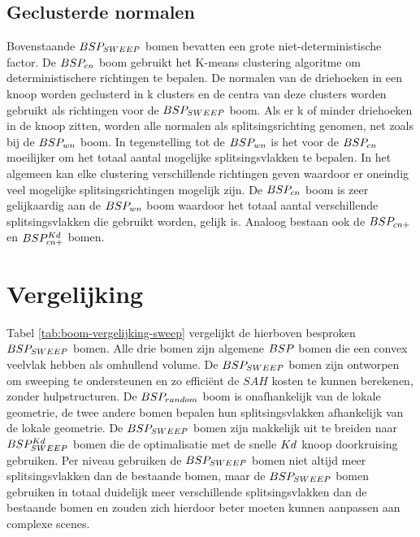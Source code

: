     

    
\subsection{Geclusterde normalen}
    Bovenstaande $BSP_{SWEEP}$ bomen bevatten een grote niet-deterministische factor.
    De $BSP_{cn}$ boom gebruikt het K-means clustering algoritme om deterministischere richtingen te bepalen.
    De normalen van de driehoeken in een knoop worden geclusterd in k clusters en de centra van deze clusters worden gebruikt als richtingen voor de $BSP_{SWEEP}$ boom.
    Als er k of minder driehoeken in de knoop zitten, worden alle normalen als splitsingsrichting genomen, net zoals bij de $BSP_{wn}$ boom.
    In tegenstelling tot de $BSP_{wn}$ is het voor de $BSP_{cn}$ moeilijker om het totaal aantal mogelijke splitsingsvlakken te bepalen.
    In het algemeen kan elke clustering verschillende richtingen geven waardoor er oneindig veel mogelijke splitsingsrichtingen mogelijk zijn.
    De $BSP_{cn}$ boom is zeer gelijkaardig aan de $BSP_{wn}$ boom waardoor het totaal aantal verschillende splitsingsvlakken die gebruikt worden, gelijk is. Analoog bestaan ook de $BSP_{cn+}$ en $BSP^{Kd}_{cn+}$ bomen.





\section{Vergelijking}
Tabel \ref{tab:boom-vergelijking-sweep} vergelijkt de hierboven besproken $BSP_{SWEEP}$ bomen.
Alle drie bomen zijn algemene $BSP$ bomen die een convex veelvlak hebben als omhullend volume.
De $BSP_{SWEEP}$ bomen zijn ontworpen om sweeping te ondersteunen en zo efficiënt de $SAH$ kosten te kunnen berekenen, zonder hulpstructuren.
De $BSP_{random}$ boom is onafhankelijk van de lokale geometrie, de twee andere bomen bepalen hun splitsingsvlakken afhankelijk van de lokale geometrie.
De $BSP_{SWEEP}$ bomen zijn makkelijk uit te breiden naar $BSP^{Kd}_{SWEEP}$ bomen die de optimalisatie met de snelle $Kd$ knoop doorkruising gebruiken.
Per niveau gebruiken de $BSP_{SWEEP}$ bomen niet altijd meer splitsingsvlakken dan de bestaande bomen, maar de $BSP_{SWEEP}$ bomen gebruiken in totaal duidelijk meer verschillende splitsingsvlakken dan de bestaande bomen en zouden zich hierdoor beter moeten kunnen aanpassen aan complexe scenes.

